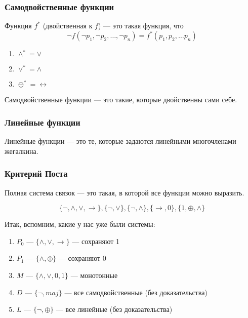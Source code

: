 

\subsubsection{Самодвойственные функции}
\begin{definition}
    Функция $f^*$ (двойственная к $f$) --- это такая функция, что
    $$\neg f(\neg p_1, \neg p_2, \dots, \neg p_n) = f^*(p_1, p_2, \dots p_n)$$
\end{definition}

\begin{example}\indent
    \begin{enumerate}
        \item $\wedge^* = \vee$
        \item $\vee^* = \wedge$
        \item $\oplus^* = \leftrightarrow$
    \end{enumerate}
\end{example}

\begin{definition}
    Самодвойственные функции --- это такие, которые двойственны сами себе.
\end{definition}

\subsubsection{Линейные функции}
\begin{definition}
    Линейные функции --- это те, которые задаются линейными многочленами жегалкина.
\end{definition}

\subsubsection{Критерий Поста}

\begin{definition}
    Полная система связок --- это такая, в которой все функции можно выразить.
\end{definition}

\begin{example}
    $$\{\neg, \wedge, \vee, \rightarrow\}, \{\neg, \vee\}, \{\neg, \wedge\}, \{\rightarrow, 0\}, \{1, \oplus, \wedge\}$$
\end{example}

Итак, вспомним, какие у нас уже были системы:
\begin{enumerate}
    \item $P_0$ --- $\{\wedge, \vee, \rightarrow\}$ --- сохраняют 1
    \item $P_1$ --- $\{\wedge, \oplus\}$ --- сохраняют 0
    \item $M$ --- $\{\wedge, \vee, 0, 1\}$ --- монотонные
    \item $D$ --- $\{\neg, maj\}$ --- все самодвойственные  (без доказательства)
    \item $L$ --- $\{\neg, \oplus\}$ --- все линейные (без доказательства)
\end{enumerate}


